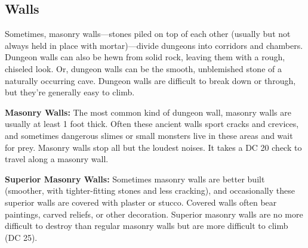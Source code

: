 \subsection{Walls}
Sometimes, masonry walls---stones piled on top of each other (usually but not always held in place with mortar)---divide dungeons into corridors and chambers. Dungeon walls can also be hewn from solid rock, leaving them with a rough, chiseled look. Or, dungeon walls can be the smooth, unblemished stone of a naturally occurring cave. Dungeon walls are difficult to break down or through, but they're generally easy to climb.


\textbf{Masonry Walls:} The most common kind of dungeon wall, masonry walls are usually at least 1 foot thick. Often these ancient walls sport cracks and crevices, and sometimes dangerous slimes or small monsters live in these areas and wait for prey. Masonry walls stop all but the loudest noises. It takes a DC 20  check to travel along a masonry wall.

\textbf{Superior Masonry Walls:} Sometimes masonry walls are better built (smoother, with tighter-fitting stones and less cracking), and occasionally these superior walls are covered with plaster or stucco. Covered walls often bear paintings, carved reliefs, or other decoration. Superior masonry walls are no more difficult to destroy than regular masonry walls but are more difficult to climb (DC 25).

